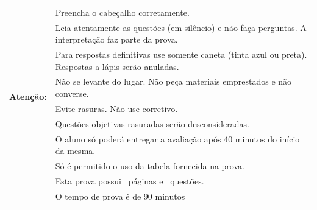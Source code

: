 \documentclass[a4paper,addpoints]{exam}
\newcommand{\timelimit}{90 minutos}
\begin{document}
	\begin{table}[h!]	
		\begin{tabularx}{19.5cm}{cX} %
			\cline{1-2}
			\multirow{9}{*}{\textbf{Atenção:}} & {Preencha o cabeçalho corretamente.} \\
			& {Leia atentamente as questões (em silêncio) e não faça perguntas. A interpretação faz parte da prova.}  \\
			& {Para respostas definitivas use somente caneta (tinta azul ou preta). Respostas a lápis serão anuladas.} \\
			& {Não se levante do lugar. Não peça materiais emprestados e não converse.} \\
			& {Evite rasuras. Não use corretivo.} \\
			& {Questões objetivas rasuradas serão desconsideradas.} \\
			& {O aluno só poderá entregar a avaliação após 40 minutos do início da mesma.} \\
			& Só é permitido o uso da tabela fornecida na prova.\\ 
			&Esta prova possui \numpages\ páginas e \numquestions\ questões.\\
			& O tempo de prova é de \timelimit\\
			 \cline{1-2}
		\end{tabularx}
	\end{table}


\end{document}
